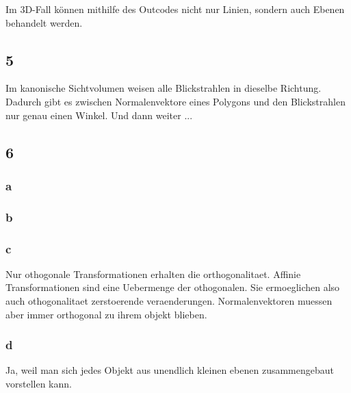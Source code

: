 \documentclass[a4paper,headings=small]{scrartcl}
\numberwithin{equation}{section} %
\numberwithin{figure}{section}   %
\begin{document}
Im 3D-Fall können mithilfe des Outcodes nicht nur Linien, sondern auch Ebenen behandelt werden.

\subsection{5}

Im kanonische Sichtvolumen weisen alle Blickstrahlen in dieselbe Richtung. Dadurch gibt es zwischen Normalenvektore eines Polygons und den Blickstrahlen nur genau einen Winkel. Und dann weiter ...

\subsection{6}

\subsubsection{a}

\subsubsection{b}

\subsubsection{c}
Nur othogonale Transformationen erhalten die orthogonalitaet.
Affinie Transformationen sind eine Uebermenge der othogonalen.
Sie ermoeglichen also auch othogonalitaet zerstoerende veraenderungen.
Normalenvektoren muessen aber immer orthogonal zu ihrem objekt blieben.

\subsubsection{d}
Ja, weil man sich jedes Objekt aus unendlich kleinen ebenen zusammengebaut vorstellen kann.
\end{document}
